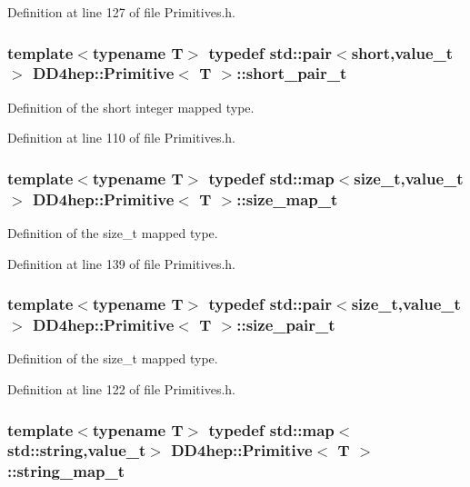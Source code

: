 Definition at line 127 of file Primitives.h.\hypertarget{struct_d_d4hep_1_1_primitive_a50698733dd2401e05ee0d064ef856363}{
\subsubsection[{short\_\-pair\_\-t}]{\setlength{\rightskip}{0pt plus 5cm}template$<$typename T$>$ typedef std::pair$<$short,{\bf value\_\-t}$>$ {\bf DD4hep::Primitive}$<$ {\bf T} $>$::{\bf short\_\-pair\_\-t}}}
\label{struct_d_d4hep_1_1_primitive_a50698733dd2401e05ee0d064ef856363}


Definition of the short integer mapped type. 

Definition at line 110 of file Primitives.h.\hypertarget{struct_d_d4hep_1_1_primitive_af954a6789fd528d13e6533a4bdb3aa21}{
\subsubsection[{size\_\-map\_\-t}]{\setlength{\rightskip}{0pt plus 5cm}template$<$typename T$>$ typedef std::map$<$size\_\-t,{\bf value\_\-t}$>$ {\bf DD4hep::Primitive}$<$ {\bf T} $>$::{\bf size\_\-map\_\-t}}}
\label{struct_d_d4hep_1_1_primitive_af954a6789fd528d13e6533a4bdb3aa21}


Definition of the size\_\-t mapped type. 

Definition at line 139 of file Primitives.h.\hypertarget{struct_d_d4hep_1_1_primitive_a330a7f3f969e59b48e16c6054668f7d3}{
\subsubsection[{size\_\-pair\_\-t}]{\setlength{\rightskip}{0pt plus 5cm}template$<$typename T$>$ typedef std::pair$<$size\_\-t,{\bf value\_\-t}$>$ {\bf DD4hep::Primitive}$<$ {\bf T} $>$::{\bf size\_\-pair\_\-t}}}
\label{struct_d_d4hep_1_1_primitive_a330a7f3f969e59b48e16c6054668f7d3}


Definition of the size\_\-t mapped type. 

Definition at line 122 of file Primitives.h.\hypertarget{struct_d_d4hep_1_1_primitive_a27b9d11befb4af57c39af66b69efdbb4}{
\subsubsection[{string\_\-map\_\-t}]{\setlength{\rightskip}{0pt plus 5cm}template$<$typename T$>$ typedef std::map$<$std::string,{\bf value\_\-t}$>$ {\bf DD4hep::Primitive}$<$ {\bf T} $>$::{\bf string\_\-map\_\-t}}}
\label{struct_d_d4hep_1_1_primitive_a27b9d11befb4af57c39af66b69efdbb4}


